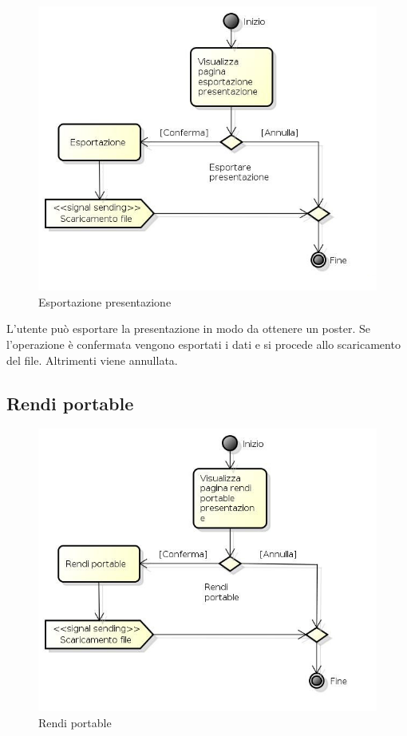 \begin{figure}[h!]
		\centering
		\includegraphics[scale=.5]{img/attivita/Esporta_presentazione.jpg}
		\caption{Esportazione presentazione}
		\label{fig:Esportazione_presentazione}
\end{figure}

L'utente può esportare la presentazione in modo da ottenere un poster. Se l'operazione è confermata vengono esportati i dati e si procede allo scaricamento del file. Altrimenti viene annullata.

\newpage

\subsection{Rendi portable}

\begin{figure}[h!]
		\centering
		\includegraphics[scale=.5]{img/attivita/Rendi_portable.jpg}
		\caption{Rendi portable}
		\label{fig:Rendi_portable}
\end{figure}

